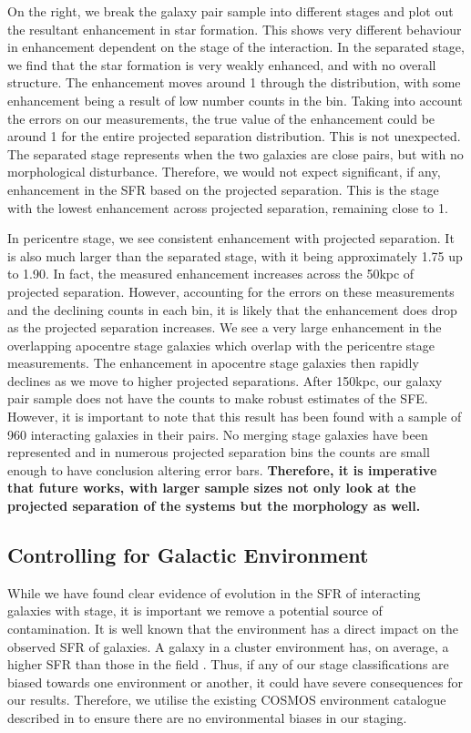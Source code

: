 On the right, we break the galaxy pair sample into different stages and plot out the resultant enhancement in star formation. This shows very different behaviour in enhancement dependent on the stage of the interaction. In the separated stage, we find that the star formation is very weakly enhanced, and with no overall structure. The enhancement moves around 1 through the distribution, with some enhancement being a result of low number counts in the bin. Taking into account the errors on our measurements, the true value of the enhancement could be around 1 for the entire projected separation distribution. This is not unexpected. The separated stage represents when the two galaxies are close pairs, but with no morphological disturbance. Therefore, we would not expect significant, if any, enhancement in the SFR based on the projected separation. This is the stage with the lowest enhancement across projected separation, remaining close to 1.

In pericentre stage, we see consistent enhancement with projected separation. It is also much larger than the separated stage, with it being approximately 1.75 up to 1.90. In fact, the measured enhancement increases across the 50kpc of projected separation. However, accounting for the errors on these measurements and the declining counts in each bin, it is likely that the enhancement does drop as the projected separation increases. We see a very large enhancement in the overlapping apocentre stage galaxies which overlap with the pericentre stage measurements. The enhancement in apocentre stage galaxies then rapidly declines as we move to higher projected separations. After 150kpc, our galaxy pair sample does not have the counts to make robust estimates of the SFE. However, it is important to note that this result has been found with a sample of 960 interacting galaxies in their pairs. No merging stage galaxies have been represented and in numerous projected separation bins the counts are small enough to have conclusion altering error bars. \textbf{Therefore, it is imperative that future works, with larger sample sizes not only look at the projected separation of the systems but the morphology as well.}

\subsection{Controlling for Galactic Environment} \label{sec:env-cont}
\noindent While we have found clear evidence of evolution in the SFR of interacting galaxies with stage, it is important we remove a potential source of contamination. It is well known that the environment has a direct impact on the observed SFR of galaxies. A galaxy in a cluster environment has, on average, a higher SFR than those in the field \citep{2006MNRAS.373..469B}. Thus, if any of our stage classifications are biased towards one environment or another, it could have severe consequences for our results. Therefore, we utilise the existing COSMOS environment catalogue described in \citet{2017ApJ...837...16D} to ensure there are no environmental biases in our staging. 

